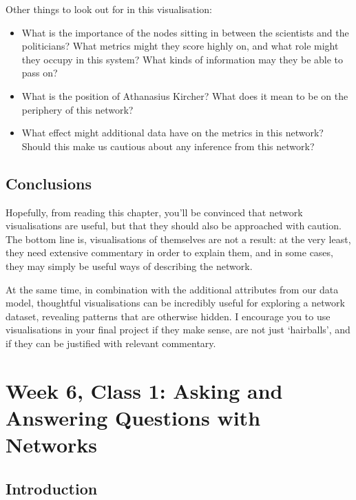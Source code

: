 \documentclass[
]{book}
\begin{document}
Other things to look out for in this visualisation:

\begin{itemize}
\item
  What is the importance of the nodes sitting in between the scientists and the politicians? What metrics might they score highly on, and what role might they occupy in this system? What kinds of information may they be able to pass on?
\item
  What is the position of Athanasius Kircher? What does it mean to be on the periphery of this network?
\item
  What effect might additional data have on the metrics in this network? Should this make us cautious about any inference from this network?
\end{itemize}

\hypertarget{conclusions-1}{%
\section{Conclusions}\label{conclusions-1}}

Hopefully, from reading this chapter, you'll be convinced that network visualisations are useful, but that they should also be approached with caution. The bottom line is, visualisations of themselves are not a result: at the very least, they need extensive commentary in order to explain them, and in some cases, they may simply be useful ways of describing the network.

At the same time, in combination with the additional attributes from our data model, thoughtful visualisations can be incredibly useful for exploring a network dataset, revealing patterns that are otherwise hidden. I encourage you to use visualisations in your final project if they make sense, are not just `hairballs', and if they can be justified with relevant commentary.

\hypertarget{week-6-class-1-asking-and-answering-questions-with-networks}{%
\chapter{Week 6, Class 1: Asking and Answering Questions with Networks}\label{week-6-class-1-asking-and-answering-questions-with-networks}}

\hypertarget{introduction-4}{%
\section{Introduction}\label{introduction-4}}
\end{document}
